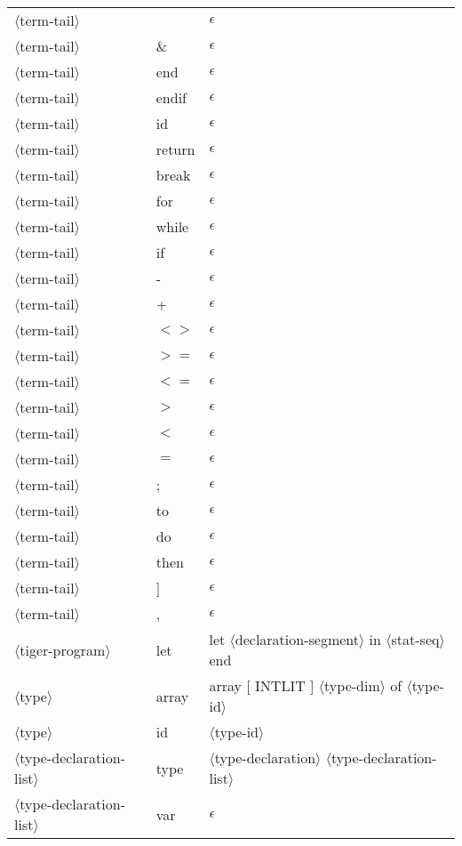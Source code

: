 \documentclass[11pt, fleqn]{article}
\newcommand{\atag}[1]{$\langle$#1$\rangle$}
\begin{document}
\begin{longtable}{l|l|l}
\atag{term-tail}					&	\textbar		&	$\epsilon$		\\
\atag{term-tail}					&	\&		&	$\epsilon$		\\
\atag{term-tail}					&	end		&	$\epsilon$		\\
\atag{term-tail}					&	endif	&	$\epsilon$		\\
\atag{term-tail}					&	id		&	$\epsilon$		\\
\atag{term-tail}					&	return	&	$\epsilon$		\\
\atag{term-tail}					&	break	&	$\epsilon$		\\
\atag{term-tail}					&	for		&	$\epsilon$		\\
\atag{term-tail}					&	while	&	$\epsilon$		\\
\atag{term-tail}					&	if		&	$\epsilon$		\\
\atag{term-tail}					&	-		&	$\epsilon$		\\
\atag{term-tail}					&	+		&	$\epsilon$		\\
\atag{term-tail}					&	$<>$		&	$\epsilon$		\\
\atag{term-tail}					&	$>=$		&	$\epsilon$		\\
\atag{term-tail}					&	$<=$		&	$\epsilon$		\\
\atag{term-tail}					&	$>$		&	$\epsilon$		\\
\atag{term-tail}					&	$<$		&	$\epsilon$		\\
\atag{term-tail}					&	$=$		&	$\epsilon$		\\
\atag{term-tail}					&	;		&	$\epsilon$		\\
\atag{term-tail}					&	to		&	$\epsilon$		\\
\atag{term-tail}					&	do		&	$\epsilon$		\\
\atag{term-tail}					&	then		&	$\epsilon$		\\
\atag{term-tail}					&	]		&	$\epsilon$		\\
\atag{term-tail}					&	,		&	$\epsilon$		\\
\atag{tiger-program}				&	let		&	let \atag{declaration-segment} in \atag{stat-seq} end	\\
\atag{type}						&	array		&	array [ INTLIT ] \atag{type-dim} of \atag{type-id}	\\
\atag{type}						&	id		&	\atag{type-id}	\\
\atag{type-declaration-list}		&	type		&	\atag{type-declaration} \atag{type-declaration-list}	\\
\atag{type-declaration-list}		&	var		&	$\epsilon$	\\

\end{longtable}
\end{document}
